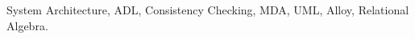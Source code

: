 \fontsize{9}{11}\selectfont System Architecture, ADL, Consistency Checking, MDA, UML, Alloy, Relational Algebra.
